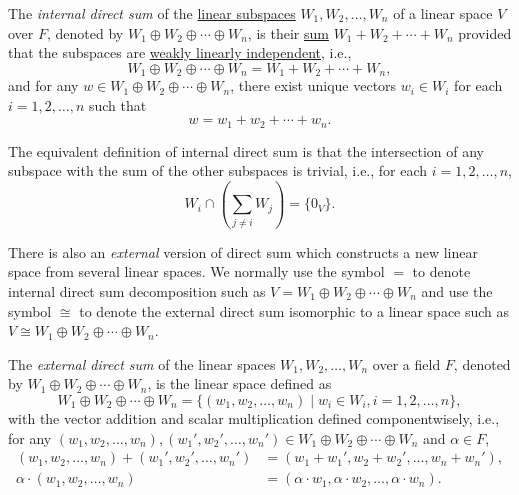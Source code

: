 \begin{definition}\label{def:internal_direct_sum}
  The \emph{internal direct sum} of the \hyperref[def:linear_subspace]{linear subspaces} $W_1, W_2, \ldots, W_n$ of a linear space $V$ over $F$, denoted by $W_1 \oplus W_2 \oplus \cdots \oplus W_n$, is their \hyperref[def:sum]{sum} $W_1 + W_2 + \cdots + W_n$ provided that the subspaces are \hyperref[def:weakly_linear_independence]{weakly linearly independent}, i.e., 
  \[
    W_1 \oplus W_2 \oplus \cdots \oplus W_n = W_1 + W_2 + \cdots + W_n,
  \]
  and for any $w \in W_1 \oplus W_2 \oplus \cdots \oplus W_n$, there exist unique vectors $w_i \in W_i$ for each $i = 1, 2, \ldots, n$ such that
  \[
    w = w_1 + w_2 + \cdots + w_n.
  \]
\end{definition}

The equivalent definition of internal direct sum is that the intersection of any subspace with the sum of the other subspaces is trivial, i.e., for each $i = 1, 2, \ldots, n$,
\[
  W_i \cap \left( \sum_{j \neq i} W_j \right) = \{ 0_V \}.
\]

There is also an \emph{external} version of direct sum which constructs a new linear space from several linear spaces. We normally use the symbol $=$ to denote internal direct sum decomposition such as $V = W_1 \oplus W_2 \oplus \cdots \oplus W_n$ and use the symbol $\cong$ to denote the external direct sum isomorphic to a linear space such as $V \cong W_1 \oplus W_2 \oplus \cdots \oplus W_n$.

\begin{definition}\label{def:external_direct_sum}
  The \emph{external direct sum} of the linear spaces $W_1, W_2, \ldots, W_n$ over a field $F$, denoted by $W_1 \oplus W_2 \oplus \cdots \oplus W_n$, is the linear space defined as
  \[
    W_1 \oplus W_2 \oplus \cdots \oplus W_n = \{ (w_1, w_2, \ldots, w_n) \mid w_i \in W_i, i = 1, 2, \ldots, n \},
  \]
  with the vector addition and scalar multiplication defined componentwisely, i.e., for any $(w_1, w_2, \ldots, w_n), (w_1', w_2', \ldots, w_n') \in W_1 \oplus W_2 \oplus \cdots \oplus W_n$ and $\alpha \in F$,
  \begin{align*}
    (w_1, w_2, \ldots, w_n) + (w_1', w_2', \ldots, w_n') & = (w_1 + w_1', w_2 + w_2', \ldots, w_n + w_n'),                     \\
    \alpha \cdot (w_1, w_2, \ldots, w_n)                 & = (\alpha \cdot w_1, \alpha \cdot w_2, \ldots, \alpha \cdot w_n).
  \end{align*}
\end{definition}

